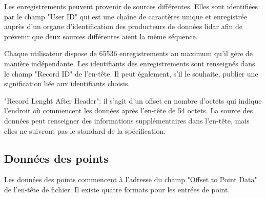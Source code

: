 Les enregistrements peuvent provenir de sources différentes.
Elles sont identifiées par le champ "User ID" qui est une chaîne de caractères unique et enregistrée auprès d'un organe d'identification des producteurs de données lidar afin de prévenir que deux sources différentes aient la même séquence.

Chaque utilisateur dispose de 65536 enregistrements au maximum qu'il gère de manière indépendante.
Les identifiants des enregistrements sont renseignés dans le champ "Record ID" de l'en-tête.
Il peut également, s'il le souhaite, publier une signification liée aux identifiants choisis.

"Record Lenght After Header": il s'agit d'un offset en nombre d'octets qui indique l'endroit où commencent les données après l'en-tête de 54 octets.
La source des données peut renseigner des informations supplémentaires dans l'en-tête, mais elles ne suivront pas le standard de la spécification.

\subsection{Données des points}

Les données des points commencent à l'adresse du champ "Offset to Point Data" de l'en-tête de fichier.
Il existe quatre formats pour les entrées de point.

